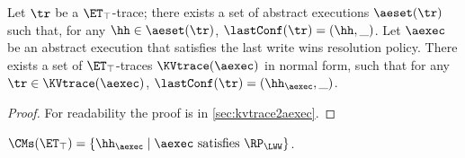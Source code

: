 \begin{theorem}
\label{thm:kvtrace2aexec}
Let $\tr$ be a $\ET_{\top}$-trace; there exists a set of abstract executions $\aeset({\tr})$ 
such that, for any $\hh \in \aeset(\tr)$, $\lastConf(\tr) = (\hh, \_)$.
Let $\aexec$ be an abstract execution that satisfies the last write wins resolution policy. 
There exists a set of $\ET_{\top}$-traces $\KVtrace({\aexec})$ in normal form, 
such that for any $\tr \in \KVtrace({\aexec})$, $\lastConf(\tr) = (\hh_{\aexec}, \_)$. 
\end{theorem}
\begin{proof}
    For readability the proof is in \cref{sec:kvtrace2aexec}.
\end{proof}

\begin{corollary} 
\label{cor:kvtrace2aexec}
$\CMs(\ET_{\top}) = \{\hh_{\aexec} \mid \aexec \text{ satisfies } \RP_{\LWW}\}$.
\end{corollary}




